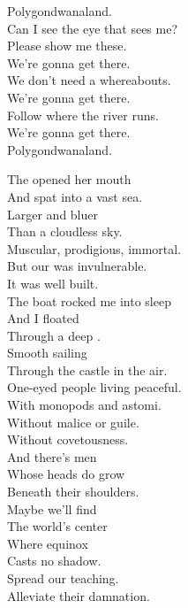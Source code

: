 Polygondwanaland. \\
Can I see the eye that sees me? \\
Please show me these. \\

We're gonna get there. \\
We don't need a whereabouts. \\
We're gonna get there. \\
Follow where the river runs. \\
We're gonna get there. \\
Polygondwanaland. \\




The  opened her mouth \\
And spat into a vast sea. \\
Larger and bluer \\
Than a cloudless sky. \\
Muscular, prodigious, immortal. \\
But our  was invulnerable. \\
It was well built. \\
The boat rocked me into sleep \\
And I floated \\
Through a deep . \\
Smooth sailing \\
Through the castle in the air. \\

One-eyed people living peaceful. \\
With monopods and astomi. \\
Without malice or guile. \\
Without covetousness. \\

And there's men \\
Whose heads do grow \\
Beneath their shoulders. \\
Maybe we'll find \\
The world's center \\
Where equinox \\
Casts no shadow. \\
Spread our teaching. \\
Alleviate their damnation. \\

